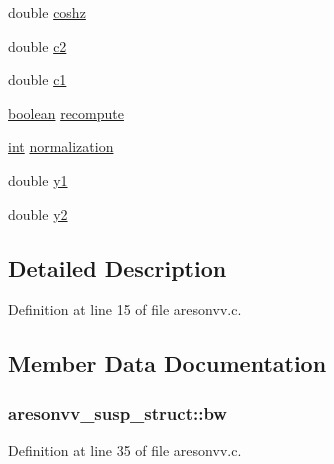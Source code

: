 \begin{DoxyCompactItemize}
\item 
double \hyperlink{structaresonvv__susp__struct_a97a10d0d2471eaa9fbf1c75f5d2c6d8d}{coshz}
\item 
double \hyperlink{structaresonvv__susp__struct_a0823683ff9b1b1a62d0be27a4e1117fa}{c2}
\item 
double \hyperlink{structaresonvv__susp__struct_a2799e02810f92daafafcfcd3b7d2fa9e}{c1}
\item 
\hyperlink{cext_8h_a7670a4e8a07d9ebb00411948b0bbf86d}{boolean} \hyperlink{structaresonvv__susp__struct_a04fc265721b1dc94eb75741631c7fa6e}{recompute}
\item 
\hyperlink{xmltok_8h_a5a0d4a5641ce434f1d23533f2b2e6653}{int} \hyperlink{structaresonvv__susp__struct_a9d04310aa267b36af7d06081817078a2}{normalization}
\item 
double \hyperlink{structaresonvv__susp__struct_af45322e59548c6fca7534bed1aae279c}{y1}
\item 
double \hyperlink{structaresonvv__susp__struct_a79325cd38a8a740a2498f09a9ed659bd}{y2}
\end{DoxyCompactItemize}


\subsection{Detailed Description}


Definition at line 15 of file aresonvv.\+c.



\subsection{Member Data Documentation}
\subsubsection[{\texorpdfstring{bw}{bw}}]{ aresonvv\+\_\+susp\+\_\+struct\+::bw}\hypertarget{structaresonvv__susp__struct_a3852375a1f4b1e49598b251417b1f48f}{}\label{structaresonvv__susp__struct_a3852375a1f4b1e49598b251417b1f48f}


Definition at line 35 of file aresonvv.\+c.

